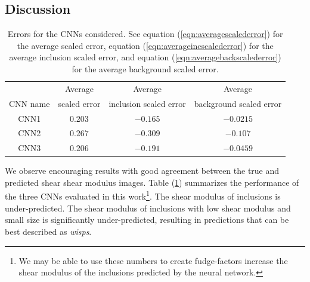 \documentclass[12pt]{article}
\newcommand{\ra}[1]{\renewcommand{\arraystretch}{#1}}
\begin{document}
\subsection{\label{sect:discussion}Discussion}
\begin{table}\centering
  \ra{1.3}
  \begin{tabular}{c|ccc}
    \toprule
                              & Average      & Average                & Average\\
            CNN name          & scaled error & inclusion scaled error & background scaled error\\
    \midrule
    CNN1                      & $0.203$   & $-0.165$     & $-0.0215$     \\
    CNN2                      & $0.267$   & $-0.309$     & $-0.107$      \\
    CNN3                      & $0.206$   & $-0.191$     & $-0.0459$     \\
  \bottomrule  
  \end{tabular}
  \caption{\label{table:cnnstatsummary} Errors for the CNNs considered. See equation (\ref{eqn:averagescalederror}) for the average scaled error, equation (\ref{eqn:averageincscalederror}) for the average inclusion scaled error, and equation (\ref{eqn:averagebackscalederror}) for the average background scaled error.}
\end{table}
%
We observe encouraging results with good agreement between the true and predicted shear shear modulus images. Table (\ref{table:cnnstatsummary}) summarizes the performance of the three CNNs evaluated in this work\footnote{We may be able to use these numbers to create fudge-factors increase the shear modulus of the inclusions predicted by the neural network.}. The shear modulus of inclusions is under-predicted. The shear modulus of inclusions with low shear modulus and small size is significantly under-predicted, resulting in predictions that can be best described as \textit{wisps}.
\end{document}
